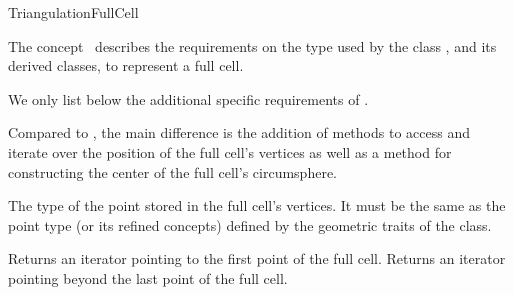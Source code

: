 \begin{ccRefConcept}{TriangulationFullCell}

\ccDefinition

The concept \ccRefName\ describes the requirements on the type used by the
class , and its derived classes, to
represent a full cell.

\ccRefines


We only list below the additional specific requirements of \ccRefName.

Compared to , the main difference is the addition of
methods to access and iterate over the position of the full cell's vertices as
well as a method for constructing the center of the full cell's circumsphere.

\ccHasModels


\ccTypes

%
{The type of the point stored in the full cell's vertices. It must be the same
as the point type  (or its refined concepts)
defined by the geometric traits of the 
class.}



\ccOperations

{Returns an iterator pointing to the first point of the full cell.}
\ccGlue
{}
{Returns an iterator pointing beyond the last point of the full cell.}


\ccSeeAlso

\\
\\

\end{ccRefConcept}
